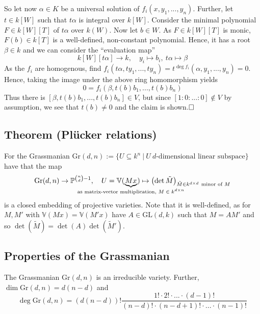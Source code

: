 \documentclass{scrartcl}
\newcommand{\V}{\mathbb{V}}
\begin{document}
So let now $\alpha \in K$ be a universal solution of $f_i(x, y_1, ..., y_n)$.
Further, let $t \in k[W]$ such that $t\alpha$ is integral over $k[W]$.
Consider the minimal polynomial $F \in k[W][T]$ of $t\alpha$ over $k(W)$.
Now let $b \in W$. As $F \in k[W][T]$ is monic, $F(b) \in k[T]$ is a well-defined, non-constant polynomial.
Hence, it has a root $\beta \in k$ and we can consider the ``evaluation map''
\begin{equation*}
    k[W][t\alpha] \to k, \quad y_i \mapsto b_i, \ t\alpha \mapsto \beta
\end{equation*}
As the $f_i$ are homogenous, find $f_i(t\alpha, ty_1, ..., ty_n) = t^{\deg f_i}(\alpha, y_1, ..., y_n) = 0$.
Hence, taking the image under the above ring homomorphism yields
\begin{equation*}
    0 = f_i(\beta, t(b) b_1, ..., t(b) b_n)
\end{equation*}
Thus there is $[\beta, t(b) b_1, ..., t(b) b_n] \in V$, but since $[1 : 0 : ... : 0] \notin V$ by assumption, we see that $t(b) \neq 0$ and the claim is shown.$\hfill\square$

\subsection{Theorem (Plücker relations)}
For the Grassmanian $\mathrm{Gr}(d, n) := \{ U \subseteq k^n \ | \ U \ \text{$d$-dimensional linear subspace}\}$ have that the map
\begin{equation*}
    \mathrm{Gr}(d, n) \to \mathbb{P}^{{n \choose d} - 1}, \quad U = \V(\underbrace{Mx}_{\mathclap{\text{as matrix-vector multiplication, $M \in k^{d \times n}$}}}) \mapsto \left( \det \tilde{M} \right)_{\tilde{M} \in k^{d \times d} \ \text{minor of $M$}}
\end{equation*}
is a closed embedding of projective varieties.
Note that it is well-defined, as for $M, M'$ with $\V(Mx) = \V(M'x)$ have $A \in \mathrm{GL}(d, k)$ such that $M = AM'$ and so $\det(\tilde{M}) = \det(A)\det(\tilde{M}')$. 

\subsection{Properties of the Grassmanian}
The Grassmanian $\mathrm{Gr}(d, n)$ is an irreducible variety.
Further, $\dim\mathrm{Gr}(d, n) = d(n - d)$ and
\begin{equation*}
    \deg\mathrm{Gr}(d, n) = (d(n - d))! \frac {1! \cdot 2! \cdot ... \cdot (d - 1)!} {(n - d)! \cdot (n - d + 1)! \cdot ... \cdot (n - 1)!}
\end{equation*}
\end{document}
